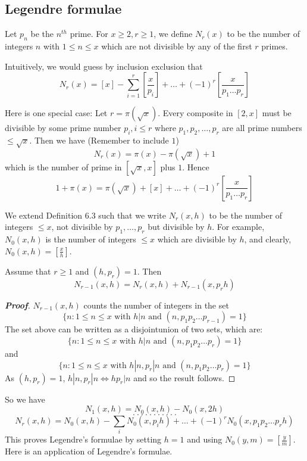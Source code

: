 \subsection{Legendre formulae}
\begin{definition} Let $p_n$ be the $n^{th}$ prime. For $x \ge 2, r \ge 1$, we define
$N_r(x)$ to be the number of integers $n$ with $1 \le n \le x$ which are not divisible by any of the
first $r$ primes.
\end{definition}
Intuitively, we would guess by inclusion exclusion that
$$N_r(x)=[x]-\sum_{i=1}^r\left[\frac{x}{p_i}\right] +\ldots +(-1)^r\left[\frac{x}{p_1 \ldots p_r}\right]$$

Here is one special case: Let $r=\pi(\sqrt{x})$. Every composite in $[2,x]$ must be divisible by some prime number $p_i, i \le r$ where $p_1,p_2,\ldots,p_r$ are all prime numbers $\le \sqrt{x}$.
Then we have (Remember to include $1$)
$$N_r(x)=\pi(x)-\pi(\sqrt{x})+1$$
which is the number of prime in $[\sqrt{x},x]$ plus $1$. Hence
$$1+\pi(x)=\pi(\sqrt{x})+[x]+\ldots +(-1)^r\left[\frac{x}{p_1 \ldots p_r}\right]$$
\begin{definition} We extend Definition 6.3 such that we write $N_r(x,h)$ to be the number of integers
$\le x$, not divisible by $p_1,\ldots,p_r$ but divisible by $h$.
For example, $N_0(x,h)$ is the number of integers $\le x$ which are divisible by $h$, and clearly,
$N_0(x,h)=[\frac{x}{h}]$.
\end{definition}
\begin{lemma} Assume that $r \ge 1$ and $(h,p_r)=1$. Then
$$N_{r-1}(x,h)=N_r(x,h)+N_{r-1}(x,p_r h)$$
\end{lemma}
\begin{proof}[\bf Proof] $N_{r-1}(x,h)$ counts the number of integers in the set
$$\{n: 1 \le n \le x \text{ with } h|n \text{ and } (n,p_1p_2\ldots p_{r-1})=1\}$$
The set above can be written as a disjointunion of two sets, which are:
$$\{n: 1 \le n \le x \text{ with } h|n \text{ and } (n,p_1p_2\ldots p_r)=1\}$$
and
$$\{n: 1 \le n \le x \text{ with } h|n,p_r|n \text{ and } (n,p_1p_2 \ldots p_r)=1\}$$
As $(h,p_r)=1$, $h|n,p_r | n \iff hp_r |n$
and so the result follows.
\end{proof}
So we have
$$N_1(x,h)=N_0(x,h)-N_0(x,2h)$$
$$.~.~.~.~.~.~.~.~.~.~. $$
$$N_r(x,h)=N_0(x,h)- \sum_{i} N_0(x,p_i h)+ \ldots +(-1)^{r} N_0(x,p_1p_2\ldots p_r h)$$
This proves Legendre's formulae by setting $h=1$ and using $N_0(y,m)=[\frac{y}{m}]$.
Here is an application of Legendre's formulae.

